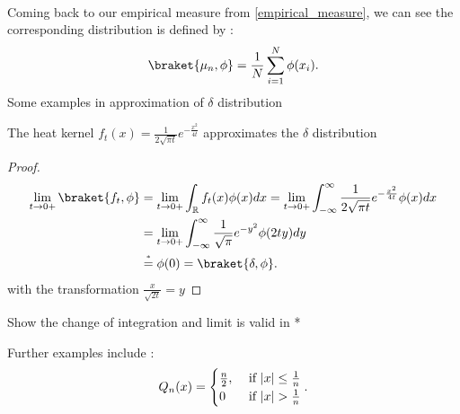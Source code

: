 \hspace{0mm}\\
Coming back to our empirical measure from \ref{empirical_measure}, we can see the corresponding distribution is defined by : 
\begin{align*}
  \braket{\mu_n,\phi } = \frac{1}{N} \sum_{i=1}^{N} \phi(x_i)
.\end{align*}
Some examples in approximation of $\delta $ distribution 
\begin{example}
  The heat kernel $f_t(x) = \frac{1}{2 \sqrt{\pi  t} } e^{- \frac{x^2}{4t}} $
  approximates the $\delta $ distribution
\begin{figure}[H]
  \begin{center}
  \end{center}
\end{figure}
\end{example}
\begin{proof}
 \begin{align*}
   \lim_{t \to 0+} \braket{f_t,\phi } &= \lim_{t \to 0+} \int_\mathbb{R} f_t(x) \phi(x) dx = \lim_{t \to 0+} \int_{-\infty}^{\infty} \frac{1}{2 \sqrt{\pi  t} } e^{- \frac{x^2}{4t}}  \phi(x) dx \\
                                      &= \lim_{t \to 0+} \int_{-\infty}^{\infty} \frac{1}{\sqrt{\pi }} e^{-y^2}  \phi(2ty) dy \\
                                      &\myS{*}{=} \phi(0) = \braket{\delta ,\phi }
 .\end{align*} 
 with the transformation $\frac{x}{\sqrt{2t}} = y$
\end{proof}
\begin{exercise}
 Show the change of integration and limit is valid in * 
\end{exercise}
Further examples  include : 
\begin{align*}
  Q_n(x) = \begin{cases}
    \frac{n}{2} , &\text{ if }\lvert x\rvert \le  \frac{1}{n}\\
    0   &\text{ if } \lvert x\rvert > \frac{1}{n} 
  \end{cases}
.\end{align*}
